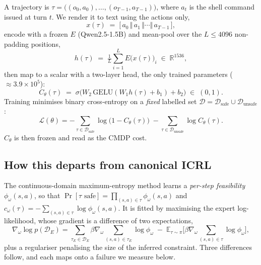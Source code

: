 \documentclass[11pt]{article}
\begin{document}
A trajectory is $\tau = \big((o_0,a_0),\dots,(o_{T-1},a_{T-1})\big)$, where $a_t$
is the shell command issued at turn $t$. We render it to text using the actions
only,
\begin{equation}
x(\tau) \;=\; \big[\, a_0 \,\Vert\, a_1 \,\Vert \cdots \Vert\, a_{T-1} \,\big],
\end{equation}
encode with a frozen $E$ (Qwen2.5-1.5B) and mean-pool over the $L \le 4096$
non-padding positions,
\begin{equation}
h(\tau) \;=\; \tfrac{1}{L}\textstyle\sum_{i=1}^{L} E\big(x(\tau)\big)_i \;\in\; \mathbb{R}^{1536},
\end{equation}
then map to a scalar with a two-layer head, the only trained parameters
($\approx 3.9\times10^{5}$):
\begin{equation}
C_\theta(\tau) \;=\; \sigma\!\big(W_2 \,\mathrm{GELU}(W_1 h(\tau) + b_1) + b_2\big) \;\in\; (0,1).
\label{eq:head}
\end{equation}
Training minimises binary cross-entropy on a \emph{fixed} labelled set
$\mathcal{D} = \mathcal{D}_{\text{safe}} \cup \mathcal{D}_{\text{unsafe}}$:
\begin{equation}
\mathcal{L}(\theta) = -\!\!\sum_{\tau \in \mathcal{D}_{\text{safe}}}\!\! \log\big(1 - C_\theta(\tau)\big)
\;-\!\! \sum_{\tau \in \mathcal{D}_{\text{unsafe}}}\!\! \log C_\theta(\tau).
\label{eq:bce}
\end{equation}
$C_\theta$ is then frozen and read as the CMDP cost.

\subsection{How this departs from canonical ICRL}

The continuous-domain maximum-entropy method \cite{malik2021} learns a
\emph{per-step feasibility} $\phi_\omega(s,a)$, so that
$\Pr[\tau \text{ safe}] = \prod_{(s,a)\in\tau}\phi_\omega(s,a)$ and
$c_\omega(\tau) = -\sum_{(s,a)\in\tau}\log \phi_\omega(s,a)$. It is fitted by
maximising the expert log-likelihood, whose gradient is a difference of two
expectations,
\begin{equation}
\nabla_\omega \log p(\mathcal{D}_E)
= \!\!\sum_{\tau_E \in \mathcal{D}_E}\!\! \beta \nabla_\omega \!\!\sum_{(s,a)\in\tau_E}\!\! \log \phi_\omega
\;-\; \mathbb{E}_{\tau \sim \pi}\Big[\beta \nabla_\omega \!\!\sum_{(s,a)\in\tau}\!\! \log \phi_\omega\Big],
\label{eq:icrl}
\end{equation}
plus a regulariser penalising the size of the inferred constraint. Three
differences follow, and each maps onto a failure we measure below.
\end{document}

